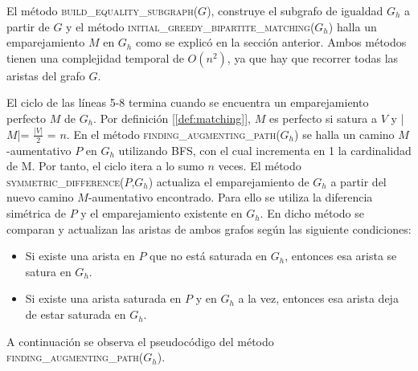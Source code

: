 \documentclass[10pt]{article} %
\begin{document}
El m\'etodo \textsc{build\_equality\_subgraph($G$}), construye el subgrafo de igualdad $G_h$ a partir de $G$ y el m\'etodo \textsc{ initial\_greedy\_bipartite\_matching($G_h$)} halla un emparejamiento $M$ en $G_h$ como se explic\'o en la secci\'on anterior. Ambos m\'etodos tienen una complejidad temporal de $O(n^2)$, ya que hay que recorrer todas las aristas del grafo $G$.

El ciclo de las l\'ineas 5-8 termina cuando se encuentra un emparejamiento perfecto $M$ de $G_h$. Por definici\'on [\ref{def:matching}], $M$ es perfecto si satura a $V$ y |$M$|= $\frac{|V|}{2}$ = $n$. En el m\'etodo \textsc{finding\_augmenting\_path($G_h$)} se halla un camino $M$-aumentativo $P$ en $G_h$ utilizando BFS, con el cual incrementa en 1 la cardinalidad de M. Por tanto, el ciclo itera a lo sumo $n$ veces. El m\'etodo \textsc{symmetric\_difference($P$,$G_h$)} actualiza el emparejamiento de $G_h$ a partir del nuevo camino $M$-aumentativo encontrado. Para ello se utiliza la diferencia sim\'etrica de $P$ y el emparejamiento existente en $G_h$. En dicho m\'etodo se comparan y actualizan las aristas de ambos grafos seg\'un las siguiente condiciones:
\begin{itemize}
	\item  Si existe una arista en $P$ que no est\'a saturada en $G_h$, entonces esa arista se satura en $G_h$.
	\item Si existe una arista saturada en $P$ y en $G_h$ a la vez, entonces esa arista deja de estar saturada en $G_h$.
\end{itemize}

A continuaci\'on se observa el pseudoc\'odigo del m\'etodo \textsc{finding\_augmenting\_path($G_h$)}. 
\end{document}
